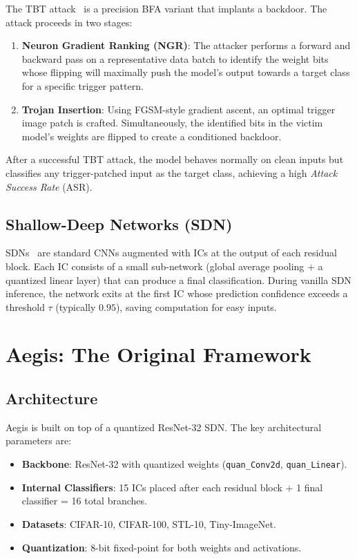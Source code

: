 \documentclass[12pt,a4paper]{article}
\newcommand{\asr}{\textsc{ASR}}
\newcommand{\tbt}{\textsc{TBT}}
\newcommand{\sdn}{\textsc{SDN}}
\newcommand{\ic}{\textsc{IC}}
\begin{document}
The \tbt{} attack~\cite{tbt2020} is a precision BFA variant that implants a backdoor. The attack proceeds in two stages:

\begin{enumerate}
    \item \textbf{Neuron Gradient Ranking (NGR)}: The attacker performs a forward and backward pass on a representative data batch to identify the weight bits whose flipping will maximally push the model's output towards a target class for a specific trigger pattern.
    \item \textbf{Trojan Insertion}: Using FGSM-style gradient ascent, an optimal trigger image patch is crafted. Simultaneously, the identified bits in the victim model's weights are flipped to create a conditioned backdoor.
\end{enumerate}

After a successful \tbt{} attack, the model behaves normally on clean inputs but classifies any trigger-patched input as the target class, achieving a high \textit{Attack Success Rate} (\asr{}).

\subsection{Shallow-Deep Networks (SDN)}

\sdn{}s~\cite{sdn} are standard CNNs augmented with \ic{}s at the output of each residual block. Each \ic{} consists of a small sub-network (global average pooling + a quantized linear layer) that can produce a final classification. During vanilla \sdn{} inference, the network exits at the first \ic{} whose prediction confidence exceeds a threshold $\tau$ (typically $0.95$), saving computation for easy inputs.

\section{Aegis: The Original Framework}
\label{sec:aegis}

\subsection{Architecture}

Aegis is built on top of a quantized ResNet-32 \sdn{}. The key architectural parameters are:
\begin{itemize}
    \item \textbf{Backbone}: ResNet-32 with quantized weights (\texttt{quan\_Conv2d}, \texttt{quan\_Linear}).
    \item \textbf{Internal Classifiers}: 15 \ic{}s placed after each residual block + 1 final classifier = 16 total branches.
    \item \textbf{Datasets}: CIFAR-10, CIFAR-100, STL-10, Tiny-ImageNet.
    \item \textbf{Quantization}: 8-bit fixed-point for both weights and activations.
\end{itemize}
\end{document}
